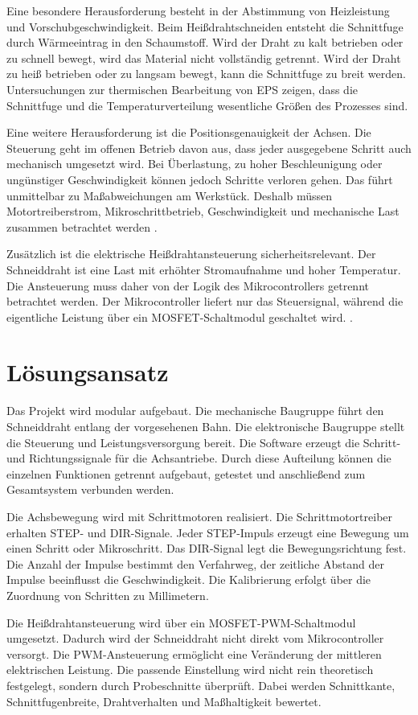Eine besondere Herausforderung besteht in der Abstimmung von Heizleistung und Vorschubgeschwindigkeit. Beim Heißdrahtschneiden entsteht die Schnittfuge durch Wärmeeintrag in den Schaumstoff. Wird der Draht zu kalt betrieben oder zu schnell bewegt, wird das Material nicht vollständig getrennt. Wird der Draht zu heiß betrieben oder zu langsam bewegt, kann die Schnittfuge zu breit werden. Untersuchungen zur thermischen Bearbeitung von EPS zeigen, dass die Schnittfuge und die Temperaturverteilung wesentliche Größen des Prozesses sind.

Eine weitere Herausforderung ist die Positionsgenauigkeit der Achsen. Die Steuerung geht im offenen Betrieb davon aus, dass jeder ausgegebene Schritt auch mechanisch umgesetzt wird. Bei Überlastung, zu hoher Beschleunigung oder ungünstiger Geschwindigkeit können jedoch Schritte verloren gehen. Das führt unmittelbar zu Maßabweichungen am Werkstück. Deshalb müssen Motortreiberstrom, Mikroschrittbetrieb, Geschwindigkeit und mechanische Last zusammen betrachtet werden \cite{Schroeder:2017}.

Zusätzlich ist die elektrische Heißdrahtansteuerung sicherheitsrelevant. Der Schneiddraht ist eine Last mit erhöhter Stromaufnahme und hoher Temperatur. Die Ansteuerung muss daher von der Logik des Mikrocontrollers getrennt betrachtet werden. Der Mikrocontroller liefert nur das Steuersignal, während die eigentliche Leistung über ein MOSFET-Schaltmodul geschaltet wird. \cite{Zach:2022}.

\section{Lösungsansatz}
\label{sec:loesungsansatz}

Das Projekt wird modular aufgebaut. Die mechanische Baugruppe führt den Schneiddraht entlang der vorgesehenen Bahn. Die elektronische Baugruppe stellt die Steuerung und Leistungsversorgung bereit. Die Software erzeugt die Schritt- und Richtungssignale für die Achsantriebe. Durch diese Aufteilung können die einzelnen Funktionen getrennt aufgebaut, getestet und anschließend zum Gesamtsystem verbunden werden.

Die Achsbewegung wird mit Schrittmotoren realisiert. Die Schrittmotortreiber erhalten STEP- und DIR-Signale. Jeder STEP-Impuls erzeugt eine Bewegung um einen Schritt oder Mikroschritt. Das DIR-Signal legt die Bewegungsrichtung fest. Die Anzahl der Impulse bestimmt den Verfahrweg, der zeitliche Abstand der Impulse beeinflusst die Geschwindigkeit. Die Kalibrierung erfolgt über die Zuordnung von Schritten zu Millimetern.

Die Heißdrahtansteuerung wird über ein MOSFET-PWM-Schaltmodul umgesetzt. Dadurch wird der Schneiddraht nicht direkt vom Mikrocontroller versorgt. Die PWM-Ansteuerung ermöglicht eine Veränderung der mittleren elektrischen Leistung. Die passende Einstellung wird nicht rein theoretisch festgelegt, sondern durch Probeschnitte überprüft. Dabei werden Schnittkante, Schnittfugenbreite, Drahtverhalten und Maßhaltigkeit bewertet.

